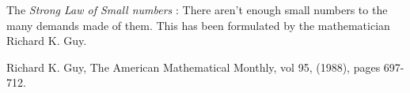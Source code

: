 \documentclass[12pt]{article}
\begin{document}
The \emph{Strong Law of Small numbers} : There aren't enough small numbers to  the many demands made of them.
This has been formulated
by the mathematician Richard K. Guy.

\begin{thebibliography}{99}
 Richard K. Guy, The American Mathematical Monthly, vol 95, (1988), pages 697-712. 
\end{thebibliography}

\end{document}
